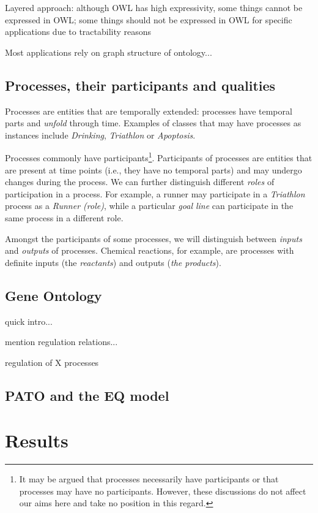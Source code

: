 \documentclass{bioinfo}
\begin{document}
Layered approach: although OWL has high expressivity, some things
cannot be expressed in OWL; some things should not be expressed in OWL
for specific applications due to tractability reasons

Most applications rely on graph structure of ontology...

\subsection{Processes, their participants and qualities}
Processes are entities that are temporally extended: processes have
temporal parts and {\em unfold} through time. Examples of classes that
may have processes as instances include {\em Drinking}, {\em
  Triathlon} or {\em Apoptosis}.

Processes commonly have participants\footnote{It may be argued that
  processes necessarily have participants or that processes may have
  no participants. However, these discussions do not affect our aims
  here and take no position in this regard.}. Participants of
processes are entities that are present at time points (i.e., they
have no temporal parts) and may undergo changes during the process.
We can further distinguish different {\em roles} of participation in a
process. For example, a runner may participate in a {\em Triathlon}
process as a {\em Runner (role)}, while a particular {\em goal line}
can participate in the same process in a different role.

Amongst the participants of some processes, we will distinguish
between {\em inputs} and {\em outputs} of processes. Chemical
reactions, for example, are processes with definite inputs (the {\em
  reactants}) and outputs ({\em the products}).

\subsection{Gene Ontology}
quick intro...

mention regulation relations... 

regulation of X processes

\subsection{PATO and the EQ model}

\section{Results}
\end{document}

